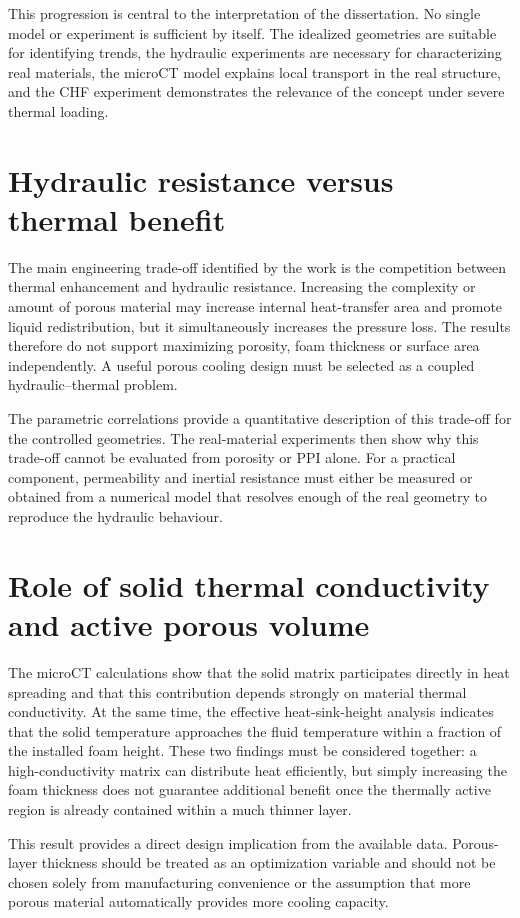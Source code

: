 \documentclass[a4paper]{article}
\begin{document}
This progression is central to the interpretation of the dissertation. No single model or experiment is sufficient by itself. The idealized geometries are suitable for identifying trends, the hydraulic experiments are necessary for characterizing real materials, the microCT model explains local transport in the real structure, and the CHF experiment demonstrates the relevance of the concept under severe thermal loading.

\section{Hydraulic resistance versus thermal benefit}
The main engineering trade-off identified by the work is the competition between thermal enhancement and hydraulic resistance. Increasing the complexity or amount of porous material may increase internal heat-transfer area and promote liquid redistribution, but it simultaneously increases the pressure loss. The results therefore do not support maximizing porosity, foam thickness or surface area independently. A useful porous cooling design must be selected as a coupled hydraulic--thermal problem.

The parametric correlations provide a quantitative description of this trade-off for the controlled geometries. The real-material experiments then show why this trade-off cannot be evaluated from porosity or PPI alone. For a practical component, permeability and inertial resistance must either be measured or obtained from a numerical model that resolves enough of the real geometry to reproduce the hydraulic behaviour.

\section{Role of solid thermal conductivity and active porous volume}
The microCT calculations show that the solid matrix participates directly in heat spreading and that this contribution depends strongly on material thermal conductivity. At the same time, the effective heat-sink-height analysis indicates that the solid temperature approaches the fluid temperature within a fraction of the installed foam height. These two findings must be considered together: a high-conductivity matrix can distribute heat efficiently, but simply increasing the foam thickness does not guarantee additional benefit once the thermally active region is already contained within a much thinner layer.

This result provides a direct design implication from the available data. Porous-layer thickness should be treated as an optimization variable and should not be chosen solely from manufacturing convenience or the assumption that more porous material automatically provides more cooling capacity.
\end{document}
